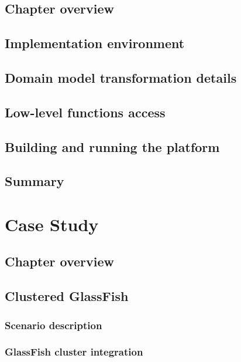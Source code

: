 \documentclass[11pt]{book}
\begin{document}
    \section*{Chapter overview}


    \section{Implementation environment}


    \section{Domain model transformation details}


    \section{Low-level functions access}


    \section{Building and running the platform}


    \section*{Summary}


  \chapter{Case Study}

    \section*{Chapter overview}

    \section{Clustered GlassFish}

      \subsection{Scenario description}

      \subsection{GlassFish cluster integration}
\end{document}
